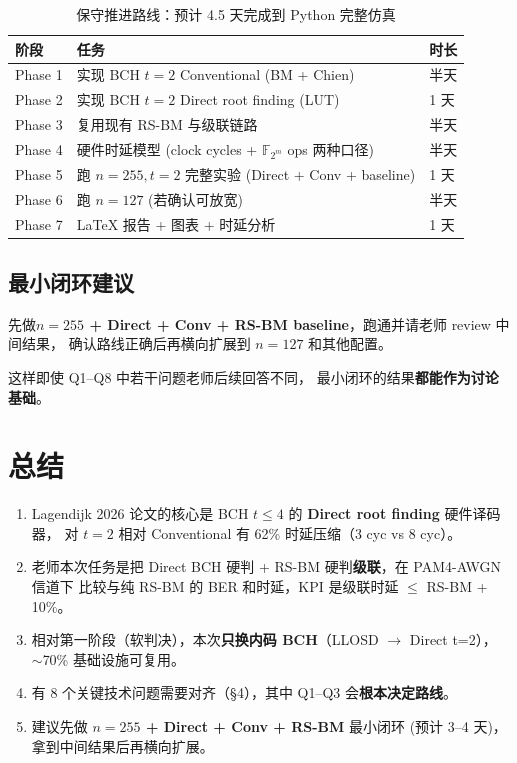 \documentclass[11pt,a4paper]{article}
\begin{document}
\begin{table}[!ht]
\centering
\begin{tabularx}{\textwidth}{lXl}
\toprule
\textbf{阶段} & \textbf{任务} & \textbf{时长} \\
\midrule
Phase 1 & 实现 BCH $t=2$ Conventional (BM + Chien) & 半天 \\
Phase 2 & 实现 BCH $t=2$ Direct root finding (LUT) & 1 天 \\
Phase 3 & 复用现有 RS-BM 与级联链路 & 半天 \\
Phase 4 & 硬件时延模型 (clock cycles + $\mathbb{F}_{2^m}$ ops 两种口径) & 半天 \\
Phase 5 & 跑 $n=255, t=2$ 完整实验 (Direct + Conv + baseline) & 1 天 \\
Phase 6 & 跑 $n=127$ (若确认可放宽) & 半天 \\
Phase 7 & LaTeX 报告 + 图表 + 时延分析 & 1 天 \\
\bottomrule
\end{tabularx}
\caption{保守推进路线：预计 4.5 天完成到 Python 完整仿真}
\end{table}

\subsection{最小闭环建议}

\begin{keybox}[title=\textbf{推荐先做的最小闭环}]
先做\textbf{$n=255$ + Direct + Conv + RS-BM baseline}，跑通并请老师 review 中间结果，
确认路线正确后再横向扩展到 $n=127$ 和其他配置。

这样即使 Q1--Q8 中若干问题老师后续回答不同，
最小闭环的结果\textbf{都能作为讨论基础}。
\end{keybox}

\section{总结}

\begin{keybox}[title=\textbf{本文核心}]
\begin{enumerate}[leftmargin=1.5em, itemsep=2pt]
\item Lagendijk 2026 论文的核心是 BCH $t \le 4$ 的 \textbf{Direct root finding} 硬件译码器，
      对 $t=2$ 相对 Conventional 有 62\% 时延压缩（3 cyc vs 8 cyc）。
\item 老师本次任务是把 Direct BCH 硬判 + RS-BM 硬判\textbf{级联}，在 PAM4-AWGN 信道下
      比较与纯 RS-BM 的 BER 和时延，KPI 是级联时延 $\le$ RS-BM + 10\%。
\item 相对第一阶段（软判决），本次\textbf{只换内码 BCH}（LLOSD $\to$ Direct t=2），
      $\sim$70\% 基础设施可复用。
\item 有 8 个关键技术问题需要对齐（\S4），其中 Q1--Q3 会\textbf{根本决定路线}。
\item 建议先做 \textbf{$n=255$ + Direct + Conv + RS-BM} 最小闭环 (预计 3--4 天)，
      拿到中间结果后再横向扩展。
\end{enumerate}
\end{keybox}
\end{document}
